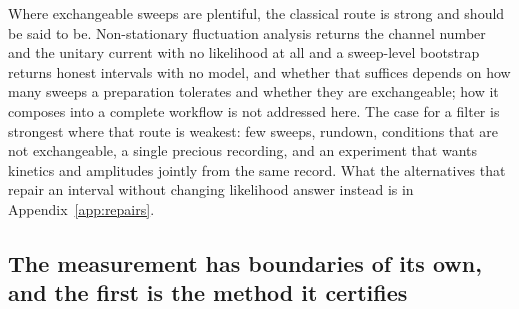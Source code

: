 Where exchangeable sweeps are plentiful, the classical route is strong and should be said to be. Non-stationary fluctuation analysis \citep{sigworth1980variance,heinemann1992nonstationary} returns the channel number and the unitary current with no likelihood at all and a sweep-level bootstrap returns honest intervals with no model, and whether that suffices depends on how many sweeps a preparation tolerates and whether they are exchangeable; how it composes into a complete workflow is not addressed here. The case for a filter is strongest where that route is weakest: few sweeps, rundown, conditions that are not exchangeable, a single precious recording, and an experiment that wants kinetics and amplitudes jointly from the same record. What the alternatives that repair an interval without changing likelihood answer instead is in Appendix~\ref{app:repairs}.

\subsection*{The measurement has boundaries of its own, and the first is the method it certifies}


